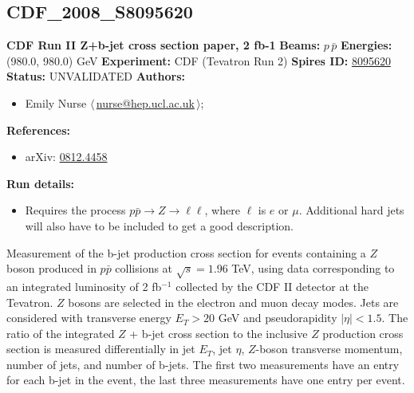 \subsection[CDF\_2008\_S8095620]{CDF\_2008\_S8095620\,\cite{Aaltonen:2008mt}}
\textbf{CDF Run II Z+b-jet cross section paper, 2 fb-1}\newline
\textbf{Beams:} $p$\,$\bar{p}$ \newline
\textbf{Energies:} (980.0, 980.0) GeV \newline
\textbf{Experiment:} CDF (Tevatron Run 2) \newline
\textbf{Spires ID:} \href{http://www.slac.stanford.edu/spires/find/hep/www?rawcmd=key+8095620}{8095620}\newline
\textbf{Status:} UNVALIDATED\newline
\textbf{Authors:}
\begin{itemize}
  \item Emily Nurse $\langle\,$\href{mailto:nurse@hep.ucl.ac.uk}{nurse@hep.ucl.ac.uk}$\,\rangle$;
\end{itemize}
\textbf{References:}
\begin{itemize}
  \item arXiv: \href{http://arxiv.org/abs/0812.4458}{0812.4458}
\end{itemize}
\textbf{Run details:}
\begin{itemize}

  \item Requires the process $p\bar{p} \rightarrow {Z} \rightarrow{\ell}\ell$, where $\ell$ is $e$ or $\mu$. Additional hard jets will also have to be included to get a good description.\end{itemize}

\noindent Measurement of the b-jet production cross section for events containing a $Z$ boson produced in $p\bar{p}$ collisions at $\sqrt{s}=1.96$ TeV, using data corresponding to an integrated luminosity of 2 fb$^{-1}$ collected by the CDF II detector at the Tevatron. $Z$ bosons are selected in the electron and muon decay modes. Jets are considered with transverse energy $E_T>20$ GeV and pseudorapidity $|\eta|<1.5$. The ratio of the integrated $Z$ + b-jet cross section to the inclusive $Z$ production cross section is measured differentially in jet $E_T$, jet $\eta$, $Z$-boson transverse momentum, number of jets, and number of b-jets. The first two measurements have an entry for each b-jet in the event, the last three measurements have one entry per event.

